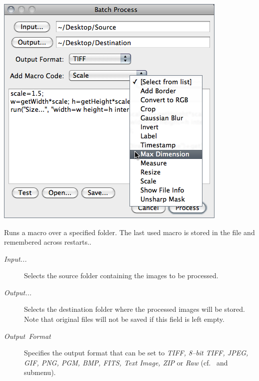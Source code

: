 \subsubsection[\protect\userinterface{Macro\ldots{}}]{\protect{}\label{sub:batch>Macro...}\improvement{}}

\begin{minipage}[c][1\totalheight][t]{0.57\columnwidth}%
\includegraphics[scale=0.55]{images/BatchProcess}%
\end{minipage}%
\begin{minipage}[c][1\totalheight][t]{0.43\columnwidth}%
Runs a macro over a specified folder. The last used macro is stored
in the  file and remembered
across restarts..
\begin{description}
\item [{\emph{Input...}}] Selects the source folder containing the images
to be processed.
\item [{\emph{Output...}}] Selects the destination folder where the processed
images will be stored. Note that original files will not be saved
if this field is left empty.
\item [{\emph{Output\ Format}}] Specifies the output format\emph{ }that
can be set to\emph{ TIFF, 8--bit TIFF, JPEG, GIF, PNG, PGM, BMP, FITS,
Text Image, ZIP }or\emph{ Raw }(cf.\  and
 submenu).\end{description}
%
\end{minipage}
